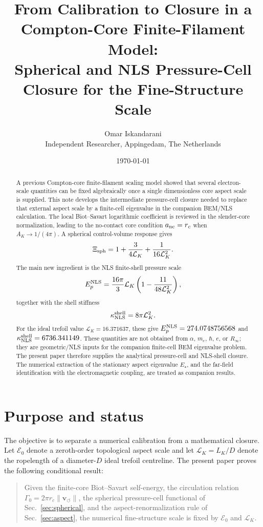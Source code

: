 \documentclass[11pt]{article}
\title{From Calibration to Closure in a Compton-Core Finite-Filament Model:\\
Spherical and NLS Pressure-Cell Closure for the Fine-Structure Scale}
\author{Omar Iskandarani\\
\small Independent Researcher, Appingedam, The Netherlands}
\date{\today}
\newcommand{\vnorm}{\lVert\mathbf{v}_{\!\boldsymbol{\circlearrowleft}}\rVert}
\newcommand{\rc}{r_c}
\newcommand{\LK}{\mathcal L_K}
\newcommand{\Ezero}{\mathcal E_0}
\begin{document}
\maketitle

\begin{abstract}
A previous Compton-core finite-filament scaling model showed that several electron-scale
quantities can be fixed algebraically once a single dimensionless core aspect scale is supplied.
This note develops the intermediate pressure-cell closure needed to replace that external
aspect scale by a finite-cell eigenvalue in the companion BEM/NLS calculation.  The local
Biot--Savart logarithmic coefficient is reviewed in the slender-core normalization, leading to
the no-contact core condition \(a_{\rm nc}=r_c\) when \(A_K\to1/(4\pi)\).  A spherical
control-volume response gives
\[
  \Xi_{\rm sph}
  =
  1+\frac{3}{4\mathcal L_K}+\frac{1}{16\mathcal L_K^2}.
\]
The main new ingredient is the NLS finite-shell pressure scale
\[
  E_p^{\rm NLS}
  =
  \frac{16\pi}{3}\mathcal L_K
  \left(1-\frac{11}{48\mathcal L_K^2}\right),
\]
together with the shell stiffness
\[
  \kappa_{\rm NLS}^{\rm shell}=8\pi\mathcal L_K^2.
\]
For the ideal trefoil value \(\mathcal L_K=16.371637\), these give
\(E_p^{\rm NLS}=274.0748756568\) and
\(\kappa_{\rm NLS}^{\rm shell}=6736.341149\).  These quantities are not obtained from
\(\alpha\), \(m_e\), \(\hbar\), \(e\), or \(R_\infty\); they are geometric/NLS inputs for the
companion finite-cell BEM eigenvalue problem.  The present paper therefore supplies the
analytical pressure-cell and NLS-shell closure.  The numerical extraction of the stationary
aspect eigenvalue \(E_\star\), and the far-field identification with the electromagnetic
coupling, are treated as companion results.
\end{abstract}

\section{Purpose and status}

The objective is to separate a numerical calibration from a mathematical closure.  Let
\(\Ezero\) denote a zeroth-order topological aspect scale and let \(\LK=L_K/D\) denote the
ropelength of a diameter-\(D\) ideal trefoil centreline.  The present paper proves the following
conditional result:

\begin{quote}
Given the finite-core Biot--Savart self-energy, the circulation relation
\(\Gamma_0=2\pi \rc\vnorm\), the spherical pressure-cell functional of
Sec.~\ref{sec:spherical}, and the aspect-renormalization rule of Sec.~\ref{sec:aspect},
the numerical fine-structure scale is fixed by \(\Ezero\) and \(\LK\).
\end{quote}
\end{document}
